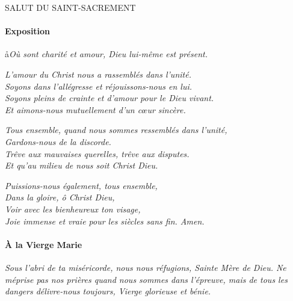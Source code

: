 \documentclass[twoside]{article}
\begin{document}
\null \newpage

\sloppy

\begin{center}\begin{doublespace}
{
\MakeUppercase{\Large Salut du Saint-Sacrement}
}
\end{doublespace}\end{center}

\paragraph{Exposition}


\aa \emph{Où sont charité et amour, Dieu lui-même est présent.} 

\vv \emph{L'amour du Christ nous a rassemblés dans l'unité.}\\
\rr \emph{Soyons dans l'allégresse et réjouissons-nous en lui.}\\
\vv \emph{Soyons pleins de crainte et d'amour pour le Dieu vivant.}\\
\rr \emph{Et aimons-nous mutuellement d'un cœur sincère.}

\vv \emph{Tous ensemble, quand nous sommes ressemblés dans l'unité,}\\
\rr \emph{Gardons-nous de la discorde.}\\
\vv \emph{Trêve aux mauvaises querelles, trêve aux disputes.}\\
\rr \emph{Et qu'au milieu de nous soit Christ Dieu.}

\vv \emph{Puissions-nous également, tous ensemble,}\\
\rr \emph{Dans la gloire, ô Christ Dieu,}\\
\vv \emph{Voir avec les bienheureux ton visage,}\\
\rr \emph{Joie immense et vraie pour les siècles sans fin. Amen.}

\paragraph{À la Vierge Marie}


\emph{Sous l'abri de ta miséricorde, nous nous réfugions, Sainte Mère de Dieu. Ne méprise pas nos prières quand nous sommes dans l'épreuve, mais de tous les dangers délivre-nous toujours, Vierge glorieuse et bénie.}
\end{document}
